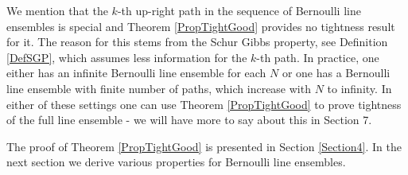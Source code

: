  We mention that the $k$-th up-right path in the sequence of Bernoulli line ensembles is special and Theorem \ref{PropTightGood} provides no tightness result for it. The reason for this stems from the Schur Gibbs property, see Definition \ref{DefSGP}, which assumes less information for the $k$-th path. In practice, one either has an infinite Bernoulli line ensemble for each $N$ or one has a Bernoulli line ensemble with finite number of paths, which increase with $N$ to infinity. In either of these settings one can use Theorem \ref{PropTightGood} to prove tightness of the full line ensemble - we will have more to say about this in Section 7.

The proof of Theorem \ref{PropTightGood} is presented in Section \ref{Section4}. In the next section we derive various properties for Bernoulli line ensembles.







